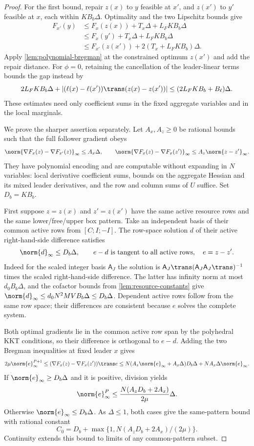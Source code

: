 \begin{proof}
For the first bound, repair $z(x)$ to $y$ feasible at $x'$, and
$z(x')$ to $y'$ feasible at $x$, each within $KB_b\Delta$.
Optimality and the two Lipschitz bounds give
\[
 \begin{split}
 F_{x'}(y)&\le F_x(z(x))+T_x\Delta+L_FKB_b\Delta\\
 &\le F_x(y')+T_x\Delta+L_FKB_b\Delta\\
 &\le F_{x'}(z(x'))+2(T_x+L_FKB_b)\Delta.
 \end{split}
\]
Apply \cref{lem:polynomial-bregman} at the constrained optimum
$z(x')$ and add the repair distance. For $\phi=0$, retaining the
cancellation of the leader-linear terms bounds the gap instead by
\[
 2L_FKB_b\Delta+
 |(\ell(x)-\ell(x'))\trans(z(x)-z(x'))|
                         \le(2L_FKB_b+B_\ell)\Delta.
\]
These estimates need only coefficient sums in the fixed aggregate
variables and in the local marginals.

We prove the sharper assertion separately. Let $A_x,A_z\ge0$ be
rational bounds such that the full follower gradient obeys
\[
 \norm{\nabla F_x(z)-\nabla F_{x'}(z)}_\infty\le A_x\Delta,
 \qquad
 \norm{\nabla F_x(z)-\nabla F_x(z')}_\infty\le A_z\norm{z-z'}_\infty.
\]
They have polynomial encoding and are computable without expanding in
$N$ variables: local derivative coefficient sums, bounds on the
aggregate Hessian and its mixed leader derivatives, and the row and
column sums of $U$ suffice. Set $D_b=KB_b$.

First suppose $z=z(x)$ and $z'=z(x')$ have the same active resource
rows and the same lower/free/upper box pattern. Take an independent
basis of their common active rows from $[C;I;-I]$. The row-space
solution $d$ of their active right-hand-side difference satisfies
\begin{equation}\label{eq:active-row-correction}
       \norm{d}_\infty\le D_b\Delta,\qquad
               e-d\text{ is tangent to all active rows},\quad e=z-z'.
\end{equation}
Indeed for the scaled integer basis $\mathsf A_J$ the solution is
$\mathsf A_J\trans(\mathsf A_J\mathsf A_J\trans)^{-1}$ times
the scaled right-hand-side difference. The latter has infinity norm
at most $d_0B_b\Delta$, and the cofactor bounds from
\cref{lem:resource-constants} give
$\norm{d}_\infty\le d_0N^2MV B_b\Delta\le D_b\Delta$.
Dependent active rows follow from the same row space; their differences
are consistent because $e$ solves the complete system.

Both optimal gradients lie in the common active row span by the
polyhedral KKT conditions, so their difference is orthogonal to $e-d$.
Adding the two Bregman inequalities at fixed leader $x$ gives
\[
 2\mu\norm{e}_\infty^{P+1}
 \le(\nabla F_x(z)-\nabla F_x(z'))\trans e
 \le N(A_z\norm{e}_\infty+A_x\Delta)D_b\Delta
                                      +NA_x\Delta\norm{e}_\infty.
\]
If $\norm{e}_\infty\ge D_b\Delta$ and it is positive, division yields
\[
 \norm{e}_\infty^P\le\frac{N(A_zD_b+2A_x)}{2\mu}\Delta.
\]
Otherwise $\norm{e}_\infty\le D_b\Delta$. As $\Delta\le1$, both
cases give the same-pattern bound with rational constant
\[
 C_0=D_b+\max\{1,N(A_zD_b+2A_x)/(2\mu)\}.
\]
Continuity extends this bound to limits of any common-pattern subset.


\end{proof}
